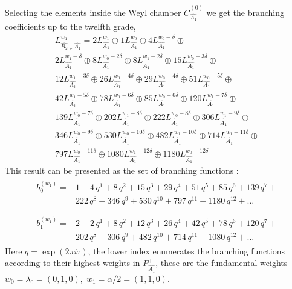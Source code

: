 \documentclass[12pt]{iopart}
\begin{document}
Selecting the elements inside the  Weyl chamber
$\bar{C}^{\left( 0 \right)}_{\hat{A_1}}$
we get the branching coefficients up to the twelfth grade,
\begin{eqnarray*}
  \label{eq:28}
  L^{w_1}_{\hat{B_2}\downarrow \hat{A_1}}=2 L_{\hat{A_1}}^{w_1}\oplus 1 L_{\hat{A_1}}^{w_0}\oplus 4 L_{\hat{A_1}}^{w_0-\delta}\oplus\\
    2 L_{\hat{A_1}}^{w_1-\delta}\oplus 8 L_{\hat{A_1}}^{w_0-2\delta}\oplus
    8 L_{\hat{A_1}}^{w_1-2\delta}\oplus 15 L_{\hat{A_1}}^{w_0-3\delta}\oplus\\
    12 L_{\hat{A_1}}^{w_1-3\delta}\oplus 26 L_{\hat{A_1}}^{w_1-4\delta}\oplus
    29 L_{\hat{A_1}}^{w_0-4\delta}\oplus 51 L_{\hat{A_1}}^{w_0-5\delta}\oplus\\
    42 L_{\hat{A_1}}^{w_1-5\delta}\oplus 78 L_{\hat{A_1}}^{w_1-6\delta}\oplus
    85 L_{\hat{A_1}}^{w_0-6\delta}\oplus 120 L_{\hat{A_1}}^{w_1-7\delta}\oplus\\
    139 L_{\hat{A_1}}^{w_0-7\delta}\oplus 202 L_{\hat{A_1}}^{w_1-8\delta}\oplus
    222 L_{\hat{A_1}}^{w_0-8\delta}\oplus 306 L_{\hat{A_1}}^{w_1-9\delta}\oplus\\
    346 L_{\hat{A_1}}^{w_0-9\delta}\oplus 530 L_{\hat{A_1}}^{w_0-10\delta}\oplus
    482 L_{\hat{A_1}}^{w_1-10\delta}\oplus 714 L_{\hat{A_1}}^{w_1-11\delta}\oplus\\
    797 L_{\hat{A_1}}^{w_0-11\delta}\oplus 1080 L_{\hat{A_1}}^{w_1-12\delta}\oplus
    1180 L_{\hat{A_1}}^{w_0-12\delta}
\end{eqnarray*}
This result can be presented as the set of branching functions \cite{kac1990idl}:
\begin{eqnarray}
  \label{eq:29}
  \begin{array}{cc}
    b^{(w_1)}_{0}= & 1 + 4\,q^{1}+ 8\,q^{2}+ 15\,q^{3}+ 29\,q^{4}+ 51\,q^{5}+ 85\,q^{6}+ 139\,q^{7}+\\
     &222\,q^{8}+ 346\,q^{9}+ 530\,q^{10}+ 797\,q^{11}+ 1180\,q^{12}+\dots\\
  \end{array}\\
  \begin{array}{cc}
    b^{(w_1)}_{1}= &2+2\,q^{1}+8\,q^{2}+12\,q^{3}+26\,q^{4}+42\,q^{5}+78\,q^{6}+120\,q^{7}+\\
    & 202\,q^{8}+306\,q^{9}+482\,q^{10}+714\,q^{11}+1080\,q^{12}+\dots
  \end{array}
\end{eqnarray}
Here $q=\exp (2\pi i \tau)$, the lower index enumerates the branching functions according
to their highest weights in $P^+_{\hat{A_1}}$,
these are the fundamental weights $w_0=\lambda_0=(0,1,0),\; w_1=\alpha/2=(1,1,0)$.
\end{document}

